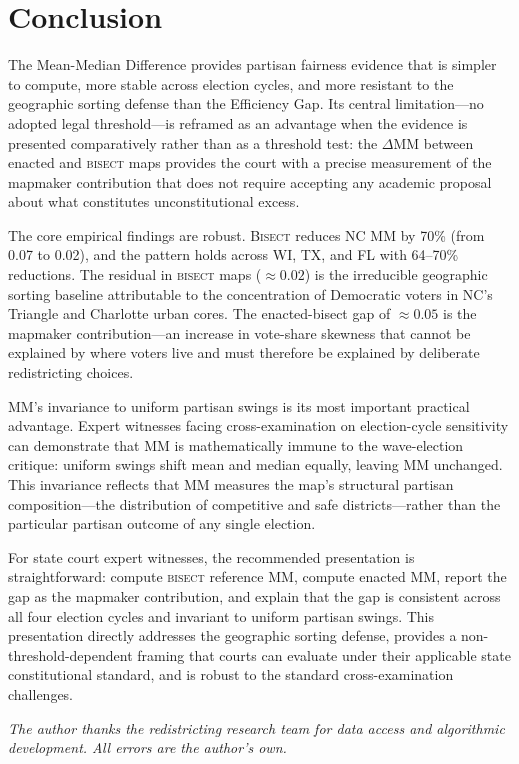 \section{Conclusion}
\label{sec:conclusion}

The Mean-Median Difference provides partisan fairness evidence that is simpler to
compute, more stable across election cycles, and more resistant to the geographic
sorting defense than the Efficiency Gap. Its central limitation---no adopted legal
threshold---is reframed as an advantage when the evidence is presented comparatively
rather than as a threshold test: the $\Delta\text{MM}$ between enacted and
\textsc{bisect} maps provides the court with a precise measurement of the mapmaker
contribution that does not require accepting any academic proposal about what
constitutes unconstitutional excess.

The core empirical findings are robust. \textsc{Bisect} reduces NC MM by 70\% (from
0.07 to 0.02), and the pattern holds across WI, TX, and FL with 64--70\% reductions.
The residual in \textsc{bisect} maps ($\approx 0.02$) is the irreducible geographic
sorting baseline attributable to the concentration of Democratic voters in NC's
Triangle and Charlotte urban cores. The enacted-bisect gap of $\approx 0.05$ is
the mapmaker contribution---an increase in vote-share skewness that cannot be
explained by where voters live and must therefore be explained by deliberate
redistricting choices.

MM's invariance to uniform partisan swings is its most important practical advantage.
Expert witnesses facing cross-examination on election-cycle sensitivity can demonstrate
that MM is mathematically immune to the wave-election critique: uniform swings shift
mean and median equally, leaving MM unchanged. This invariance reflects that MM
measures the map's structural partisan composition---the distribution of competitive
and safe districts---rather than the particular partisan outcome of any single election.

For state court expert witnesses, the recommended presentation is straightforward:
compute \textsc{bisect} reference MM, compute enacted MM, report the gap as the
mapmaker contribution, and explain that the gap is consistent across all four election
cycles and invariant to uniform partisan swings. This presentation directly addresses
the geographic sorting defense, provides a non-threshold-dependent framing that courts
can evaluate under their applicable state constitutional standard, and is robust
to the standard cross-examination challenges.

\bigskip

\noindent\textit{The author thanks the redistricting research team for data
access and algorithmic development. All errors are the author's own.}
